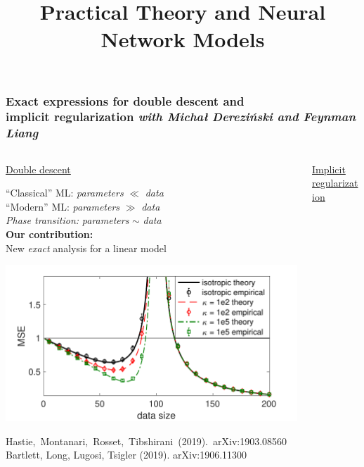 \documentclass{beamer}
\begin{document}
\title[Practical Theory \& NN Models]{ Practical Theory and Neural Network Models }

\begin{frame}
  \frametitle{Exact expressions for double descent and\\
implicit regularization\hfill 
\footnotesize{\it with Micha{\l } Derezi\'{n}ski and  Feynman Liang}}

\begin{columns}
  \begin{column}{0.5\textwidth}
    \begin{center}
      {
        \large\underline{Double descent}}
    \end{center}
    \vspace{2mm}
    \small
    
    ``Classical'' ML: \hfill\textit{parameters} $\ll$ \textit{data}\quad~\\
    ``Modern'' ML: \hfill \textit{parameters} $\gg$ \textit{data}\quad~\\
\textit{Phase transition:} \hfill\textit{parameters} $\sim$ \textit{data}\quad~\\[7mm]
\textbf{Our contribution:}\\
New \textit{exact} analysis for a linear model
    
\includegraphics[width=\textwidth]{figs/descent-intro-nice}
\vspace{2mm}

{\footnotesize
\mbox{Hastie, Montanari, Rosset, Tibshirani (2019).~arXiv:1903.08560}\\
   Bartlett, Long, Lugosi, Tsigler (2019). arXiv:1906.11300\\
}
  

\end{column}
\begin{column}{0.5\textwidth}
    \begin{center}
      {
        \large\underline{Implicit regularization}}
  \end{center}
  \vspace{2mm}
  \small
  

\end{column}
\end{columns}
\end{frame}
\end{document}
